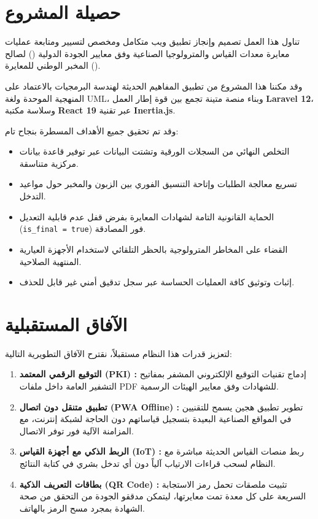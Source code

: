 \documentclass{bts-report-ar}
\begin{document}
\section*{حصيلة المشروع}
تناول هذا العمل تصميم وإنجاز تطبيق ويب متكامل ومخصص لتسيير ومتابعة عمليات معايرة معدات القياس والمترولوجيا الصناعية وفق معايير الجودة الدولية () لصالح المخبر الوطني للمعايرة ().

وقد مكننا هذا المشروع من تطبيق المفاهيم الحديثة لهندسة البرمجيات بالاعتماد على المنهجية الموحدة ولغة UML، وبناء منصة متينة تجمع بين قوة إطار العمل \textbf{Laravel 12}، وسلاسة مكتبة \textbf{React 19} عبر تقنية \textbf{Inertia.js}.

وقد تم تحقيق جميع الأهداف المسطرة بنجاح تام:
\begin{itemize}
  \item التخلص النهائي من السجلات الورقية وتشتت البيانات عبر توفير قاعدة بيانات مركزية متناسقة.
  \item تسريع معالجة الطلبات وإتاحة التنسيق الفوري بين الزبون والمخبر حول مواعيد التدخل.
  \item الحماية القانونية التامة لشهادات المعايرة بفرض قفل عدم قابلية التعديل (\texttt{is\_final = true}) فور المصادقة.
  \item القضاء على المخاطر المترولوجية بالحظر التلقائي لاستخدام الأجهزة العيارية المنتهية الصلاحية.
  \item إثبات وتوثيق كافة العمليات الحساسة عبر سجل تدقيق أمني غير قابل للحذف.
\end{itemize}

\section*{الآفاق المستقبلية}
لتعزيز قدرات هذا النظام مستقبلاً، نقترح الآفاق التطويرية التالية:
\begin{enumerate}
  \item \textbf{التوقيع الرقمي المعتمد (PKI) :} إدماج تقنيات التوقيع الإلكتروني المشفر بمفاتيح التشفير العامة داخل ملفات PDF للشهادات وفق معايير الهيئات الرسمية.
  \item \textbf{تطبيق متنقل دون اتصال (PWA Offline) :} تطوير تطبيق هجين يسمح للتقنيين في المواقع الصناعية البعيدة بتسجيل قياساتهم دون الحاجة لشبكة إنترنت، مع المزامنة الآلية فور توفر الاتصال.
  \item \textbf{الربط الذكي مع أجهزة القياس (IoT) :} ربط منصات القياس الحديثة مباشرة مع النظام لسحب قراءات الارتياب آلياً دون أي تدخل بشري في كتابة النتائج.
  \item \textbf{بطاقات التعريف الذكية (QR Code) :} تثبيت ملصقات تحمل رمز الاستجابة السريعة على كل معدة تمت معايرتها، ليتمكن مدققو الجودة من التحقق من صحة الشهادة بمجرد مسح الرمز بالهاتف.
\end{enumerate}
\end{document}
